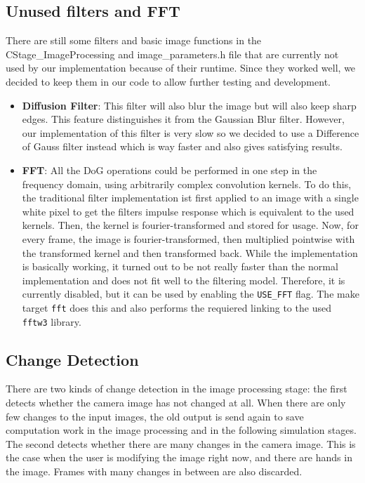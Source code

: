 \subsection{Unused filters and FFT}
\noindent There are still some filters and basic image functions in the CStage\_ImageProcessing and image\_parameters.h file that are currently not used by our implementation because of their runtime. Since they worked well, we decided to keep them in our code to allow further testing and development. 
\begin{itemize}
	\item \textbf{Diffusion Filter}: This filter will also blur the image but will also keep sharp edges. This feature distinguishes it from the Gaussian Blur filter. However, our implementation of this filter is very slow so we decided to use a Difference of Gauss filter instead which is way faster and also gives satisfying results.
	\item \textbf{FFT}: All the DoG operations could be performed in one step in the frequency domain, using arbitrarily complex convolution kernels. To do this, the traditional filter implementation ist first applied to an image with a single white pixel to get the filters impulse response which is equivalent to the used kernels. Then, the kernel is fourier-transformed and stored for usage. Now, for every frame, the image is fourier-transformed, then multiplied pointwise with the transformed kernel and then transformed back. While the implementation is basically working, it turned out to be not really faster than the normal implementation and does not fit well to the filtering model. Therefore, it is currently disabled, but it can be used by enabling the \verb-USE_FFT- flag. The make target \verb-fft- does this and also performs the requiered linking to the used \verb-fftw3- library.
\end{itemize}

\subsection{Change Detection}
There are two kinds of change detection in the image processing stage: the first detects whether the camera image has not changed at all. When there are only few changes to the input images, the old output is send again to save computation work in the image processing and in the following simulation stages.\\

\noindent The second detects whether there are many changes in the camera image. This is the case when the user is modifying the image right now, and there are hands in the image. Frames with many changes in between are also discarded.

